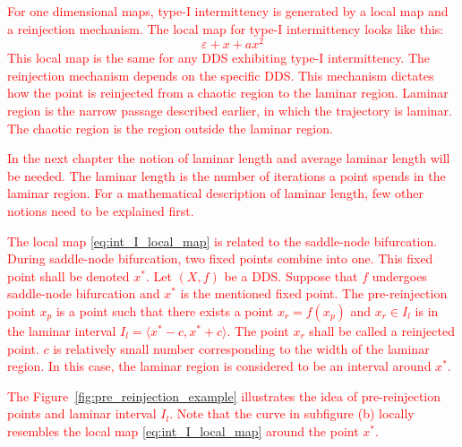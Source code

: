 \textcolor{red}{
For one dimensional maps, type-I intermittency is generated by a local map and a reinjection mechanism.
The local map for type-I intermittency looks like this:
\begin{equation}
\varepsilon + x + a x^2 \label{eq:int_I_local_map}
\end{equation}
This local map is the same for any DDS exhibiting type-I intermittency.
The reinjection mechanism depends on the specific DDS.
This mechanism dictates how the point is reinjected from a chaotic region to the laminar region.
Laminar region is the narrow passage described earlier, in which the trajectory is laminar.
The chaotic region is the region outside the laminar region.
}
\par
\textcolor{red}{
In the next chapter the notion of laminar length and average laminar length will be needed.
The laminar length is the number of iterations a point spends in the laminar region.
For a mathematical description of laminar length, few other notions need to be explained first.
}
\par
\textcolor{red}{
The local map \ref{eq:int_I_local_map} is related to the saddle-node bifurcation.
During saddle-node bifurcation, two fixed points combine into one.
This fixed point shall be denoted $x^{*}$.
Let $(X, f)$ be a DDS. Suppose that $f$ undergoes saddle-node bifurcation and $x^{*}$ is the mentioned fixed point.
The pre-reinjection point $x_p$ is a point such that there exists a point $x_r = f(x_p)$ and $x_r \in I_l$ is in the laminar interval $I_l = \langle x^{*}-c, x^{*}+c \rangle$.
The point $x_r$ shall be called a reinjected point.
$c$ is relatively small number corresponding to the width of the laminar region.
In this case, the laminar region is considered to be an interval around $x^{*}$.
}
\par
\textcolor{red}{
The Figure~\ref{fig:pre_reinjection_example} illustrates the idea of pre-reinjection points and laminar interval $I_l$.
Note that the curve in subfigure (b) locally resembles the local map \ref{eq:int_I_local_map} around the point $x^{*}$.
}
